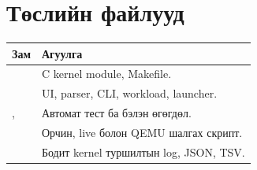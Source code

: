 \section{Төслийн файлууд}
\begin{table}[H]
\centering\small
\begin{tabularx}{\textwidth}{@{}P{4cm}Y@{}}\toprule
Зам & Агуулга \\\midrule
{} & C kernel module, Makefile. \\
 & UI, parser, CLI, workload, launcher. \\
,  & Автомат тест ба бэлэн өгөгдөл. \\
 & Орчин, live болон QEMU шалгах скрипт. \\
 & Бодит kernel туршилтын log, JSON, TSV. \\
\bottomrule
\end{tabularx}
\end{table}


